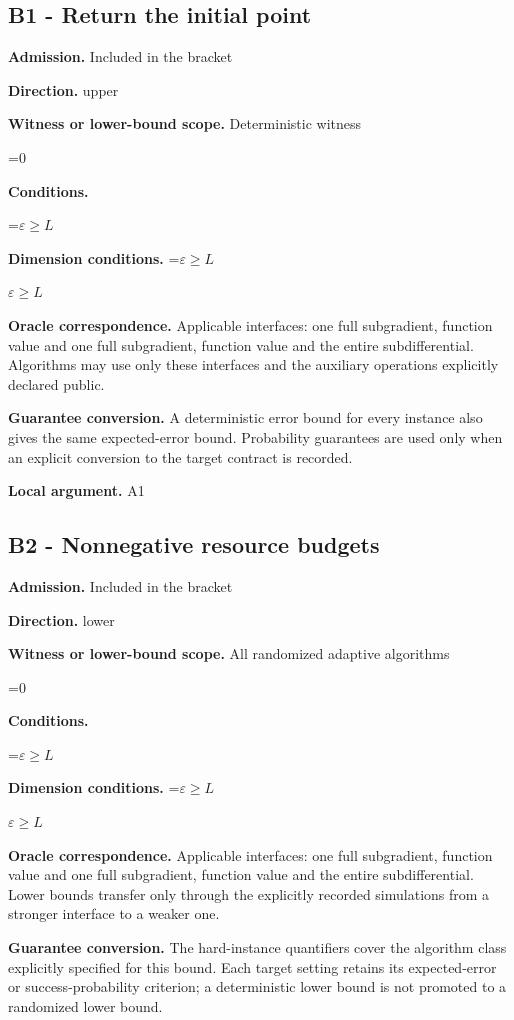 \documentclass[10pt,a4paper]{article}
\newcommand{\AtlasMath}[1]{\par\begingroup\centering\setbox0=\hbox{$\displaystyle #1$}\ifdim\wd0>1.4\linewidth\typeout{ATLAS WIDE FORMULA: \the\wd0}\fi\ifdim\wd0>\linewidth\resizebox{\linewidth}{!}{\box0}\else\box0\fi\par\endgroup}
\newcommand{\AtlasInlineMath}[1]{\begingroup\setbox0=\hbox{$#1$}\ifdim\wd0>.4\linewidth\endgroup\AtlasMath{#1}\else\endgroup$#1$\fi}
\begin{document}
\subsection{B1 - Return the initial point}
\textbf{Admission.} Included in the bracket

\textbf{Direction.} upper

\textbf{Witness or lower-bound scope.} Deterministic witness

\AtlasMath{0}
\textbf{Conditions.} 
\AtlasMath{\varepsilon\ge L}


\textbf{Dimension conditions.} \AtlasInlineMath{\varepsilon\ge L}

\textbf{Oracle correspondence.} Applicable interfaces: one full subgradient, function value and one full subgradient, function value and the entire subdifferential. Algorithms may use only these interfaces and the auxiliary operations explicitly declared public.

\textbf{Guarantee conversion.} A deterministic error bound for every instance also gives the same expected-error bound. Probability guarantees are used only when an explicit conversion to the target contract is recorded.

\textbf{Local argument.} A1

\subsection{B2 - Nonnegative resource budgets}
\textbf{Admission.} Included in the bracket

\textbf{Direction.} lower

\textbf{Witness or lower-bound scope.} All randomized adaptive algorithms

\AtlasMath{0}
\textbf{Conditions.} 
\AtlasMath{\varepsilon\ge L}


\textbf{Dimension conditions.} \AtlasInlineMath{\varepsilon\ge L}

\textbf{Oracle correspondence.} Applicable interfaces: one full subgradient, function value and one full subgradient, function value and the entire subdifferential. Lower bounds transfer only through the explicitly recorded simulations from a stronger interface to a weaker one.

\textbf{Guarantee conversion.} The hard-instance quantifiers cover the algorithm class explicitly specified for this bound. Each target setting retains its expected-error or success-probability criterion; a deterministic lower bound is not promoted to a randomized lower bound.
\end{document}
